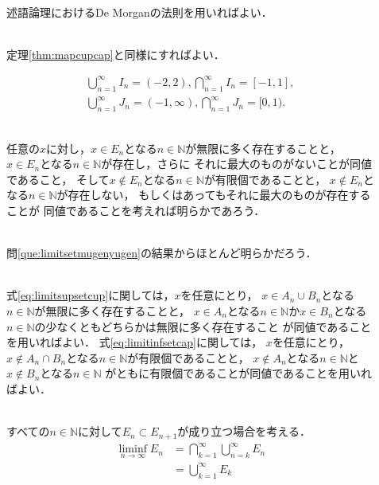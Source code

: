 \begin{description}
\item[] \mbox{} \\
  述語論理におけるDe Morganの法則を用いればよい．
\item[] \mbox{} \\
  定理\ref{thm:mapcupcap}と同様にすればよい．
\item[] 
  \begin{align*}
    \bigcup_{n=1}^{\infty} I_n = (-2,2) ,  \bigcap_{n=1}^{\infty} I_n = [-1,1] , \\
    \bigcup_{n=1}^{\infty} J_n = (-1,\infty) ,  \bigcap_{n=1}^{\infty} J_n = [0,1) .
  \end{align*}
\item[] \mbox{} \\
  任意の$x$に対し，$x \in E_n$となる$n \in \mathbb{N}$が無限に多く存在することと，
  $x \in E_n$となる$n \in \mathbb{N}$が存在し，さらに
  それに最大のものがないことが同値であること，
  そして$x \notin E_n$となる$n \in \mathbb{N}$が有限個であることと，
  $x \notin E_n$となる$n \in \mathbb{N}$が存在しない，
  もしくはあってもそれに最大のものが存在することが
  同値であることを考えれば明らかであろう．
\item[] \mbox{} \\
  問\ref{que:limitsetmugenyugen}の結果からほとんど明らかだろう．
\item[] \mbox{} \\ 
  式\eqref{eq:limitsupsetcup}に関しては，$x$を任意にとり，
  $x \in A_n \cup B_n$となる$n \in \mathbb{N}$が無限に多く存在することと，
  $x \in A_n$となる$n \in \mathbb{N}$か$x \in B_n$となる
  $n \in \mathbb{N}$の少なくともどちらかは無限に多く存在すること
  が同値であることを用いればよい．
  式\eqref{eq:limitinfsetcap}に関しては，
  $x$を任意にとり，
  $x \notin A_n \cap B_n$となる$ n \in \mathbb{N}$が有限個であることと，
  $x \notin A_n$となる$n \in \mathbb{N}$と$x \notin B_n$となる$n \in \mathbb{N}$
  がともに有限個であることが同値であることを用いればよい．
\item[] \mbox{} \\
  すべての$n \in \mathbb{N}$に対して$E_n \subset E_{n+1}$が成り立つ場合を考える．
  \begin{align*}
    \liminf_{n \to \infty} E_n 
    & = \bigcap_{k=1}^{\infty} \bigcup_{n=k}^{\infty} E_n \\
    & = \bigcup_{k=1}^{\infty} E_k \\

\end{align*}
\end{description}
